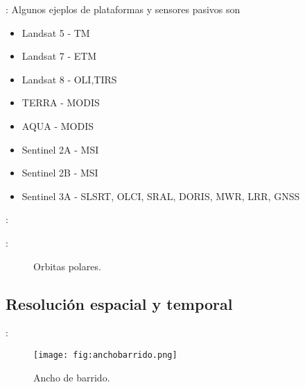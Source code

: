 \begin{frame}{\secname : \subsecname}
  Algunos ejeplos de plataformas y sensores pasivos son
  \begin{itemize}
    \item<1->{Landsat 5 - TM}
    \item<3-> Landsat 7 - ETM
    \item<4-> Landsat 8 - OLI,TIRS
    \item<5-> TERRA - MODIS
    \item<5-> AQUA - MODIS
    \item<6-> Sentinel 2A - MSI
    \item<6-> Sentinel 2B - MSI
    \item<7-> Sentinel 3A - SLSRT, OLCI, SRAL, DORIS, MWR, LRR, GNSS
  \end{itemize}
\end{frame}

\begin{frame}{\secname : \subsecname}
\end{frame}

\begin{frame}{\secname : \subsecname}
  \begin{figure}
    \centering
    \caption{Orbitas polares.}
    \label{}
  \end{figure}
\end{frame}


\subsection{Resolución espacial y temporal}

\begin{frame}{\secname : \subsecname}
  \begin{figure}
    \centering
    \texttt{[image: fig:anchobarrido.png]}
    \caption{Ancho de barrido.}
    \label{}
  \end{figure}
\end{frame}

